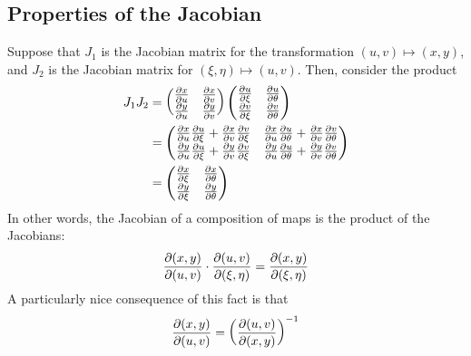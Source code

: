 \documentclass{../../template/note}
\begin{document}
    \subsection{Properties of the Jacobian}

    Suppose that \(J_1\) is the Jacobian matrix for the transformation \((u, v) \mapsto (x, y)\), and \(J_2\) is the Jacobian matrix for \((\xi, \eta) \mapsto (u, v)\). Then, consider the product
    \begin{align*}
        J_1J_2 &= \begin{pmatrix}
            \pd x u & \pd x v \\
            \pd y u & \pd y v \\
        \end{pmatrix}\begin{pmatrix}
            \pd u \xi & \pd u \theta \\
            \pd v \xi & \pd v \theta \\
        \end{pmatrix} \\
        &= \begin{pmatrix}
            \pd x u \pd u \xi + \pd x v \pd v \xi & \pd x u \pd u \theta + \pd x v \pd v \theta \\
            \pd y u \pd u \xi + \pd y v \pd v \xi & \pd y u \pd u \theta + \pd y v \pd v \theta \\
        \end{pmatrix} \\
        &= \begin{pmatrix}
            \pd x \xi & \pd x \theta \\
            \pd y \xi & \pd y \theta \\
        \end{pmatrix}
    \end{align*}
    In other words, the Jacobian of a composition of maps is the product of the Jacobians:
    \begin{align*}
        \pd{(x, y)}{(u, v)} \cdot \pd{(u, v)}{(\xi, \eta)} = \pd{(x, y)}{(\xi, \eta)}
    \end{align*}
    A particularly nice consequence of this fact is that
    \begin{align*}
        \pd{(x, y)}{(u, v)} = \left(\pd{(u, v)}{(x, y)}\right)^{-1}
    \end{align*}
    
\end{document}
